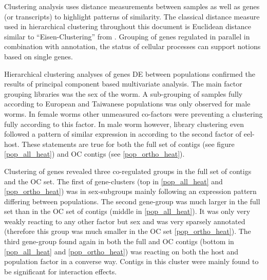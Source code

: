 Clustering analysis uses distance measurements between samples as well
as genes (or transcripts) to highlight patterns of similarity. The
classical distance measure used in hierarchical clustering throughout
this document is Euclidean distance similar to ``Eisen-Clustering''
from \cite{pmid9843981}. Grouping of genes regulated in parallel in
combination with annotation, the status of cellular processes can
support notions based on single genes.

Hierarchical clustering analyses of genes DE between populations
confirmed the results of principal component based multivariate
analysis. The main factor grouping libraries was the sex of the
worm. A sub-grouping of samples fully according to European and
Taiwanese populations was only observed for male worms. In female
worms other unmeasured co-factors were preventing a clustering fully
according to this factor. In male worm however, library clustering
even followed a pattern of similar expression in according to the
second factor of eel-host. These statements are true for both the full
set of contigs (see figure \ref{pop_all_heat}) and OC contigs (see
\ref{pop_ortho_heat}).

Clustering of genes revealed three co-regulated groups in the full set
of contigs and the OC set. The first of gene-clusters (top in
\ref{pop_all_heat} and \ref{pop_ortho_heat}) was in sex-subgroups
mainly following an expression pattern differing between
populations. The second gene-group was much larger in the full set
than in the OC set of contigs (middle in \ref{pop_all_heat}). It was
only very weakly reacting to any other factor but sex and was very
sparsely annotated (therefore this group was much smaller in the OC
set \ref{pop_ortho_heat}). The third gene-group found again in both
the full and OC contigs (bottom in \ref{pop_all_heat} and
\ref{pop_ortho_heat}) was reacting on both the host and population
factor in a converse way. Contigs in this cluster were mainly found to
be significant for interaction effects.


